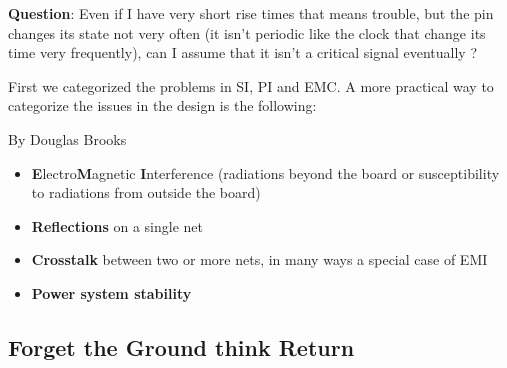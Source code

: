 \documentclass[final]{cubedoc}
\begin{document}
	\textbf{Question}: Even if I have very short rise times that means trouble, but the pin changes its state not very often (it isn't periodic like the clock that change its time very frequently), can I assume that it isn't a critical signal eventually \cite{instruments1999pcb}?
	
	First we categorized the problems in SI, PI and EMC. A more practical way to categorize the issues in the design is the following:
	
	
	
	By Douglas Brooks
	
	\begin{itemize}
		\item \textbf{E}lectro\textbf{M}agnetic \textbf{I}nterference (radiations beyond the board or susceptibility to radiations from outside the board)
		\item \textbf{Reflections} on a single net
		\item \textbf{Crosstalk} between two or more nets, in many ways a special case of EMI
		\item \textbf{Power system stability} 
	\end{itemize}
	
	\subsection{Forget the Ground think Return}
	
	
\end{document}

